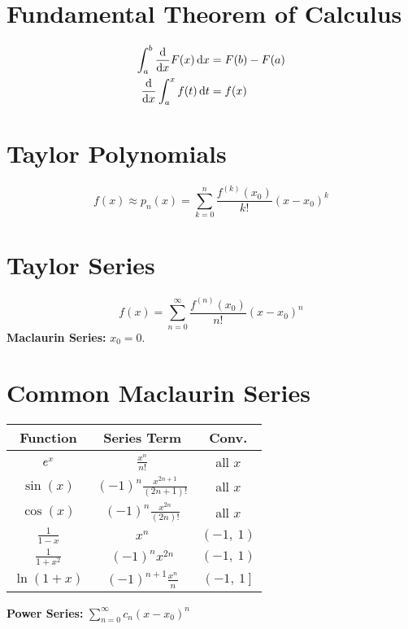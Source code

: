 \documentclass{article}
\begin{document}
\begin{multicols}{3}
    \section*{Fundamental Theorem of Calculus}
    \begin{align*}
        \int_a^b \dv{x}F(x) \dd{x} & = F(b) - F(a) \\
        \dv{x}\int_a^x f(t) \dd{t} & = f(x)
    \end{align*}
    \section*{Taylor Polynomials}
    \begin{equation*}
        f(x) \approx p_n(x) = \sum_{k=0}^n \frac{f^{\left( k \right)}(x_0)}{k!} \left( x-x_0 \right)^k
    \end{equation*}
    \section*{Taylor Series}
    \begin{equation*}
        f(x) = \sum_{n=0}^{\infty} \frac{f^{\left( n \right)}(x_0)}{n!}\left( x-x_0 \right)^n
    \end{equation*}
    \textbf{Maclaurin Series:} \(x_0 = 0\).
    \section*{Common Maclaurin Series}
    \begin{table}[H]
        \centering
        \begin{tabular}{c c c}
            \toprule
            \textbf{Function}           & \textbf{Series Term}                                          & \textbf{Conv.}             \\
            \midrule
            \(e^{x}\)                  & \(\frac{x^n}{n!}\)                                            & all \(x\)                  \\
            \(\sin{\left( x \right)}\)  & \(\left( -1 \right)^n \frac{x^{2n+1}}{\left( 2n+1 \right)!}\) & all \(x\)                  \\
            \(\cos{\left( x \right)}\)  & \(\left( -1 \right)^n \frac{x^{2n}}{\left( 2n \right)!}\)     & all \(x\)                  \\
            \(\frac{1}{1-x}\)           & \(x^n\)                                                       & \(\left( -1,\: 1 \right)\) \\
            \(\frac{1}{1+x^2}\)         & \(\left( -1 \right)^n x^{2n}\)                                & \(\left( -1,\: 1 \right)\) \\
            \(\ln{\left( 1+x \right)}\) & \(\left( -1 \right)^{n+1} \frac{x^n}{n}\)                     & \(\left( -1,\: 1 \right]\) \\ %
            \bottomrule
        \end{tabular}
    \end{table}
    \textbf{Power Series:} \(\sum_{n=0}^{\infty} c_n\left( x-x_0 \right)^n\)

\end{multicols}
\end{document}
